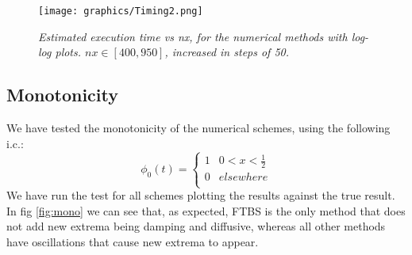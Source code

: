 \begin{figure}[H]
	\begin{center}
		\texttt{[image: graphics/Timing2.png]}
	\end{center}%
	\caption[computational cost of numerical methods]{ \em Estimated execution time vs nx, for the numerical methods with log-log plots.  $nx\in [400, 950]$, increased in steps of 50.}
	\label{fig:timing2}
\end{figure}

\subsection{Monotonicity}
\label{sec:mono}
We have tested the monotonicity of the numerical schemes, using the following i.c.:
\begin{equation}
\phi_0(t)=\left\{
\begin{array}{lr}
1 & 0<x<\frac{1}{2} \\
0 &  elsewhere \\
\end{array}
\right.
\label{eq:initcondsquare}
\end{equation}
We have run the test for all schemes plotting the results against the true result. In fig \ref{fig:mono} we can see that, as expected, FTBS is the only method that does not add new extrema being damping and diffusive, whereas all other methods have oscillations that cause new extrema to appear.
